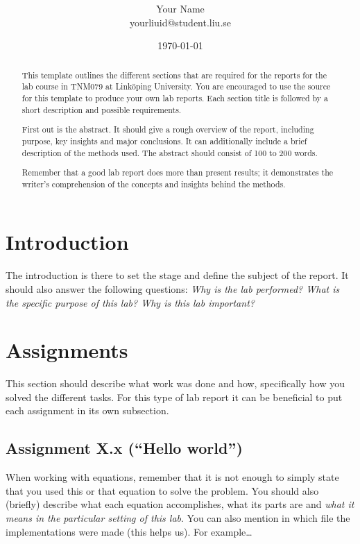 \documentclass[onecolumn]{article}
\title{\spacecaps{Lab report: Lab 0 }\\ \normalsize \spacesc{TNM079, Modeling and Animation} }
\author{Your Name\\yourliuid@student.liu.se}
\date{\today}
\begin{document}
\maketitle

\begin{abstract}
This template outlines the different sections that are required for the reports for the lab course in TNM079 at Link\"oping University. You are encouraged to use the source for this template to produce your own lab reports. Each section title is followed by a short description and possible requirements.

First out is the abstract. It should give a rough overview of the report, including purpose, key insights and major conclusions. It can additionally include a brief description of the methods used. The abstract should consist of 100 to 200 words.

Remember that a good lab report does more than present results; it demonstrates the writer's comprehension of the concepts and insights behind the methods.
\end{abstract}


\section{Introduction}
The introduction is there to set the stage and define the subject of the report. It should also answer the following questions: \emph{Why is the lab performed? What is the specific purpose of this lab? Why is this lab important?}

\section{Assignments}
This section should describe what work was done and how, specifically how you solved the different tasks. For this type of lab report it can be beneficial to put each assignment in its own subsection.

\subsection{Assignment X.x (``Hello world'')}

When working with equations, remember that it is not enough to simply state that you used this or that equation to solve the problem. You should also (briefly) describe what each equation accomplishes, what its parts are and \emph{what it means in the particular setting of this lab}. You can also mention in which file the implementations were made (this helps us). For example\dots
\end{document}
